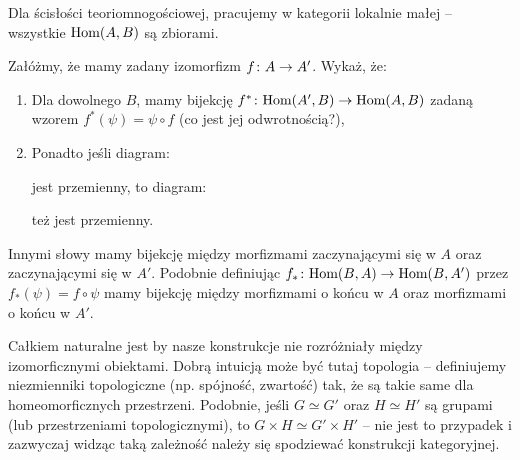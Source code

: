 \begin{exc}
  \label{exc:izomorficzne_obiekty}
  Dla ścisłości teoriomnogościowej, pracujemy w kategorii lokalnie małej -- wszystkie $\textrm{Hom}(A, B)$ są zbiorami.

  Załóżmy, że mamy zadany izomorfizm $f\colon A\to A'$. Wykaż, że:
  \begin{enumerate}
    \item Dla dowolnego $B$, mamy bijekcję $f^*\colon \textrm{Hom}(A', B)\to \textrm{Hom}(A, B)$ zadaną wzorem $f^*(\psi) = \psi \circ f$ (co jest jej odwrotnością?),
    \item Ponadto jeśli diagram:
      \begin{center}
      \end{center}
     jest przemienny, to diagram:
     \begin{center}
    \end{center}
    też jest przemienny.
  \end{enumerate}
  Innymi słowy mamy bijekcję między morfizmami zaczynającymi się w $A$ oraz zaczynającymi się w $A'$. Podobnie definiując $f_* \colon \textrm{Hom}(B, A)\to \textrm{Hom}(B, A')$ przez $f_*(\psi) = f\circ \psi$ mamy bijekcję między morfizmami o końcu w $A$ oraz morfizmami o końcu w $A'$.
\end{exc}

\begin{remk}
  Całkiem naturalne jest by nasze konstrukcje nie rozróżniały między izomorficznymi obiektami. Dobrą intuicją może być tutaj topologia -- definiujemy niezmienniki topologiczne (np. spójność, zwartość) tak, że są takie same dla homeomorficznych przestrzeni. Podobnie, jeśli $G\simeq G'$ oraz $H\simeq H'$ są grupami (lub przestrzeniami topologicznymi), to $G\times H \simeq G'\times H'$ -- nie jest to przypadek i zazwyczaj widząc taką zależność należy się spodziewać konstrukcji kategoryjnej.
\end{remk}

